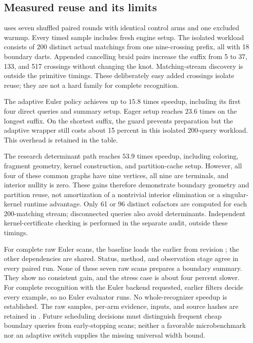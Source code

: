 \subsection{Measured reuse and its limits}

 uses seven shuffled paired rounds with
identical control arms and one excluded warmup.  Every timed sample includes
fresh engine setup.  The isolated workload consists of 200 distinct actual
matchings from one nine-crossing prefix, all with 18 boundary darts.  Appended
cancelling braid pairs increase the suffix from 5 to 37, 133, and 517
crossings without changing the knot.  Matching-stream discovery is outside
the primitive timings.  These deliberately easy added crossings isolate
reuse; they are not a hard family for complete recognition.



The adaptive Euler policy achieves up to $15.8$ times speedup, including its
first four direct queries and summary setup.  Eager setup reaches $23.6$
times on the longest suffix.  On the shortest suffix, the guard prevents
preparation but the adaptive wrapper still costs about 15 percent in this
isolated 200-query workload.  This overhead is retained in the table.

The research determinant path reaches $53.9$ times speedup, including
coloring, fragment geometry, kernel construction, and partition-cache setup.
However, all four of these common graphs have nine vertices, all nine are
terminals, and interior nullity is zero.  These gains therefore demonstrate
boundary geometry and partition reuse, not amortization of a nontrivial
interior elimination or a singular-kernel runtime advantage.  Only 61 or
96 distinct cofactors are computed for each 200-matching stream; disconnected
queries also avoid determinants.  Independent kernel-certificate checking
is performed in the separate audit, outside these timings.



For complete raw Euler scans, the baseline loads the earlier
 from revision ; the other dependencies
are shared.  Status, method, and observation stage agree in every paired
run.  None of these seven raw scans prepares a boundary summary.  They show
no consistent gain, and the stress case is about four percent slower.
For complete recognition with the Euler backend requested, earlier filters
decide every example, so no Euler evaluator runs.  No whole-recognizer
speedup is established.  The raw samples, per-arm evidence, inputs, and
source hashes are retained in
.  Future scheduling decisions
must distinguish frequent cheap boundary queries from early-stopping scans;
neither a favorable microbenchmark nor an adaptive switch supplies the
missing universal width bound.
